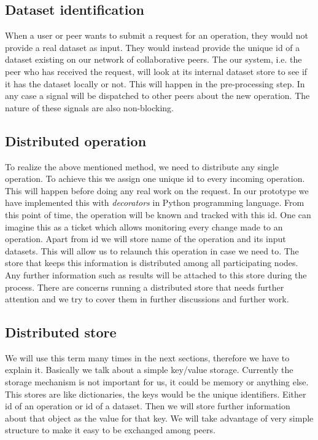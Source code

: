 \subsection{Dataset identification}
When a user or peer wants to submit a request for an operation, they would not provide a real dataset as input.
They would instead provide the unique id of a dataset existing on our network of collaborative peers.
The our system, i.e. the peer who has received the request, will look at its internal dataset store to see if it
has the dataset locally or not.
This will happen in the pre-processing step. 
In any case a signal will be dispatched to other peers about the new operation.
The nature of these signals are also non-blocking.

\subsection{Distributed operation}
To realize the above mentioned method, we need to distribute any single operation. To achieve this we assign one unique id
to every incoming operation. This will happen before doing any real work on the request. In our prototype we have implemented
this with \textit{decorators} in Python programming language. 
From this point of time, 
the operation will be known and tracked with this id. One can imagine this as a ticket which
allows monitoring every change made to an operation. 
Apart from id we will store name of the operation and its input datasets. 
This will allow us to relaunch this operation in case we need to. 
The store that keeps this information is distributed among all participating nodes. 
Any further information such as results will be attached to this store during the process. 
There are concerns running a distributed store that needs further attention and 
we try to cover them in further discussions and further work.

\subsection{Distributed store}
We will use this term many times in the next sections, therefore we have to explain it.
Basically we talk about a simple key/value storage. 
Currently the storage mechanism is not important for us, it could be memory or anything else.
This stores are like dictionaries, the keys would be the unique identifiers.
Either id of an operation or id of a dataset. 
Then we will store further information about that object as the value for that key.
We will take advantage of very simple structure to make it easy to be exchanged among peers.

